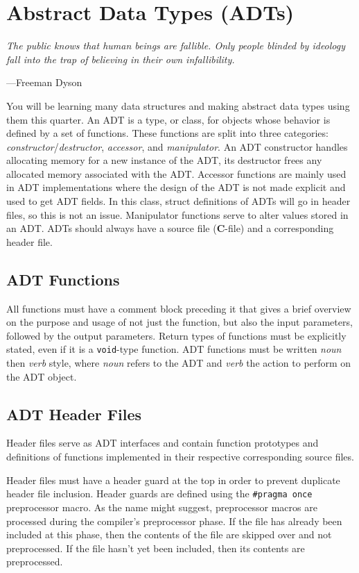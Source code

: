 \documentclass[11pt]{article}
\begin{document}
\section{Abstract Data Types (ADTs)}

\epigraph{\emph{The public knows that human beings are fallible. Only
people blinded by ideology fall into the trap of believing in their
own infallibility.}}{---Freeman Dyson}

\noindent You will be learning many data structures and making abstract
data types using them this quarter. An ADT is a type, or class, for
objects whose behavior is defined by a set of functions. These functions
are split into three categories: \emph{constructor}/\emph{destructor},
\emph{accessor}, and \emph{manipulator}. An ADT constructor handles
allocating memory for a new instance of the ADT, its destructor frees
any allocated memory associated with the ADT. Accessor functions are
mainly used in ADT implementations where the design of the ADT is not
made explicit and used to get ADT fields. In this class, struct
definitions of ADTs will go in header files, so this is not an issue.
Manipulator functions serve to alter values stored in an ADT. ADTs
should always have a source file (\textbf{C}-file) and a corresponding
header file.


\subsection{ADT Functions}

All functions must have a comment block preceding it that gives a brief overview
on the purpose and usage of not just the function, but also the input
parameters, followed by the output parameters. Return types of functions must be
explicitly stated, even if it is a \texttt{void}-type function. ADT functions
must be written \emph{noun} then \emph{verb} style, where \emph{noun} refers to
the ADT and \emph{verb} the action to perform on the ADT object.


\subsection{ADT Header Files} \label{headers}

Header files serve as ADT interfaces and contain function prototypes and
definitions of functions implemented in their respective corresponding source
files.

Header files must have a header guard at the top in order to prevent
duplicate header file inclusion.
Header guards are defined using the
\texttt{\#pragma once} preprocessor macro. As the name might suggest,
preprocessor macros are processed during the compiler's preprocessor
phase. If the file has already been included at this phase, then the
contents of the file are skipped over and not preprocessed. If the file
hasn't yet been included, then its contents are preprocessed.
\end{document}
